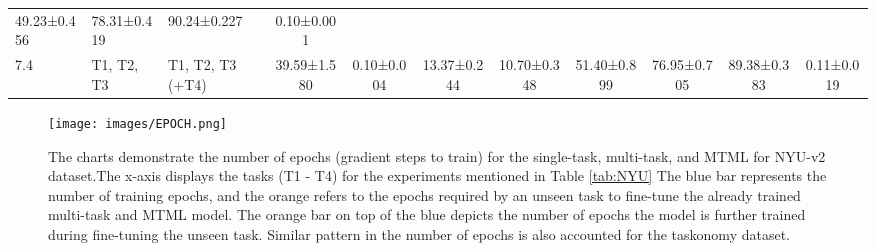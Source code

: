 \documentclass[conference]{IEEEtran}
\begin{document}
\begin{table*}[t]
\begin{tiny}
{\begin{tabular}{lllcccccccc}
  49.23±0.456 &
  78.31±0.419 &
  90.24±0.227 &
  0.10±0.001 \\
7.4 &
  T1, T2, T3 &
  T1, T2, T3 (+T4) &
  39.59±1.580 &
  0.10±0.004 &
  13.37±0.244 &
  10.70±0.348 &
  51.40±0.899 &
  76.95±0.705 &
  89.38±0.383 &
  0.11±0.019 \\ \hline
\end{tabular}}
\end{tiny}
\vspace{-0.3cm}
\end{table*} \begin{figure*}[ht]
    \centering
    \texttt{[image: images/EPOCH.png]}
\caption{The charts demonstrate the number of epochs (gradient steps to train) for the single-task, multi-task, and \ac{MTML} for NYU-v2 dataset.The x-axis displays the tasks (T1 - T4) for the experiments mentioned in Table \ref{tab:NYU} The blue bar represents the number of training epochs, and the orange refers to the epochs required by an unseen task to fine-tune the already trained multi-task and \ac{MTML} model. The orange bar on top of the blue depicts the number of epochs the model is further trained during fine-tuning the unseen task. Similar pattern in the number of epochs is also accounted for the taskonomy dataset.}
    \label{fig:epochs}
    \vspace{-0.6cm}
\end{figure*}
\end{document}
